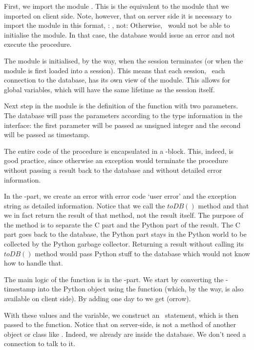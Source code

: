 First, we import the module .
This is the equivalent to the  module
that we imported on client side.
Note, however, that on server side
it is necessary to import the module in this format,
\ie: , not: 
Otherwise, \nowdb\ would not be able to initialise the module.
In that case, the database would issue an error 
and not execute the procedure.

The module is initialised, by the way, when the session
terminates (or when the module is first loaded into a session).
This means
that each session, \ie\ each connection to the database,
has its own view of the module. This allows for
global variables, which will have the same lifetime
as the session itself.

Next step in the module is
the definition of the function  with two parameters.
The database will pass the parameters according to the type
information in the interface: the first parameter
will be passed as unsigned integer and the second
will be passed as timestamp.

The entire code of the procedure is encapsulated
in a -block. This, indeed, is
good practice, since otherwise
an exception would terminate the procedure without
passing a result back to the database and without
detailed error information.

In the -part, we create
an error with error code `user error' and
the exception string as detailed information.
Notice that we call the $toDB()$ method
and that we in fact return the result of that
method, not the result itself.
The purpose of the method is to separate
the C part and the Python part of the result.
The C part goes back to the database,
the Python part stays in the Python world
to be collected by the Python garbage collector.
Returning a result without calling its $toDB()$
method would pass Python stuff
to the database which would not know how to handle
that.

The main logic of the function
is in the -part.
We start by converting the \nowdb-timestamp
into the Python  object 
using the  function
(which, by the way,
is also available on client side).
By adding one day to  we get
(orrow).

With these values and the 
variable, we construct an \sql\ statement,
which is then passed to the 
function. Notice that on server-side,
 is not a method of another
object or class like .
Indeed, we already are inside the database.
We don't need a connection to talk to it.

